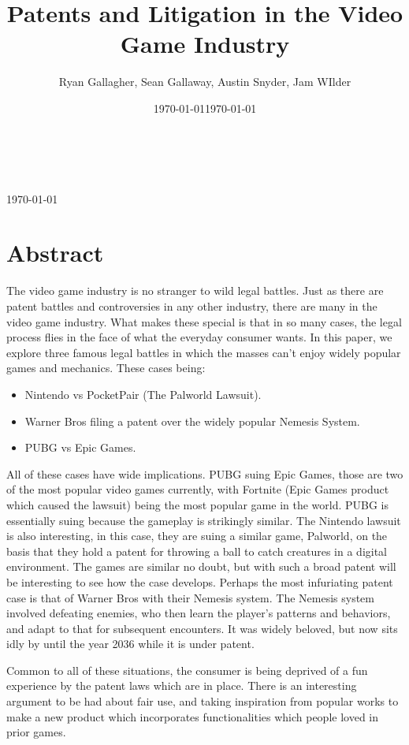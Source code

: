\documentclass[12pt,letterpaper]{article}
\title{Patents and Litigation in the Video Game Industry}
\author{Ryan Gallagher, Sean Gallaway, Austin Snyder, Jam WIlder}
\date{\today}
\makeatletter
\renewcommand{\maketitle}{\bgroup
   \begin{center}
   \textbf{{\fontsize{18pt}{20}\selectfont \@title}}\\
   \vspace{10pt}
   {\fontsize{12pt}{0}\selectfont \@author}
   \\ \today

   \end{center}
\egroup}
\makeatother
\begin{document}
\date{\today}
\maketitle
\thispagestyle{fancy}

\pagebreak

\section{Abstract}
The video game industry is no stranger to wild legal battles. Just as there are patent battles and controversies in any other industry, there are many in the video game industry. What makes these special is that in so many cases, the legal process flies in the face of what the everyday consumer wants. In this paper, we explore three famous legal battles in which the masses can't enjoy widely popular games and mechanics. These cases being:
\begin{itemize}
    \item Nintendo vs PocketPair (The Palworld Lawsuit).
    \item Warner Bros filing a patent over the widely popular Nemesis System.
    \item PUBG vs Epic Games.
\end{itemize}
\par All of these cases have wide implications. PUBG suing Epic Games, those are two of the most popular video games currently, with Fortnite (Epic Games product which caused the lawsuit) being the most popular game in the world. PUBG is essentially suing because the gameplay is strikingly similar. The Nintendo lawsuit is also interesting, in this case, they are suing a similar game, Palworld, on the basis that they hold a patent for throwing a ball to catch creatures in a digital environment. The games are similar no doubt, but with such a broad patent will be interesting to see how the case develops. Perhaps the most infuriating patent case is that of Warner Bros with their Nemesis system. The Nemesis system involved defeating enemies, who then learn the player's patterns and behaviors, and adapt to that for subsequent encounters. It was widely beloved, but now sits idly by until the year 2036 while it is under patent.
\par Common to all of these situations, the consumer is being deprived of a fun experience by the patent laws which are in place. There is an interesting argument to be had about fair use, and taking inspiration from popular works to make a new product which incorporates functionalities which people loved in prior games.
\end{document}
